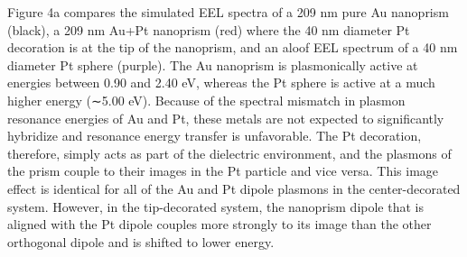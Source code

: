 \documentclass [11pt, proquest] {uwthesis}[2016/11/22]
\begin{document}
Figure 4a compares the simulated EEL spectra of a 209 nm pure Au nanoprism (black), a 209 nm Au+Pt nanoprism (red) where the 40 nm diameter Pt decoration is at the tip of the nanoprism, and an aloof EEL spectrum of a 40 nm diameter Pt sphere (purple). The Au nanoprism is plasmonically active at energies between 0.90 and 2.40 eV, whereas the Pt sphere is active at a much higher energy (∼5.00 eV). Because of the spectral mismatch in plasmon resonance energies of Au and Pt, these metals are not expected to significantly hybridize and resonance energy transfer is unfavorable. The Pt decoration, therefore, simply acts as part of the dielectric environment, and the plasmons of the prism couple to their images in the Pt particle and vice versa. This image effect is identical for all of the Au and Pt dipole plasmons in the center-decorated system. However, in the tip-decorated system, the nanoprism dipole that is aligned with the Pt dipole couples more strongly to its image than the other orthogonal dipole and is shifted to lower energy.
\end{document}
